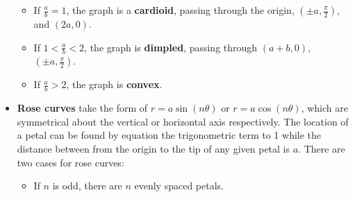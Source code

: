 \documentclass[../AP_Calculus]{subfiles}
\begin{document}
\begin{itemize}
\begin{itemize}
\begin{center}
							\end{center}
						\item If $\frac{a}{b} = 1$, the graph is a \textbf{cardioid}, passing through the origin, $\left(\pm a, \frac{\pi}{2}\right)$, and $(2a, 0)$.
							\begin{center}
							\end{center}
						\item If $1 < \frac{a}{b} < 2$, the graph is \textbf{dimpled}, passing through $(a + b, 0)$, $\left(\pm a, \frac{\pi}{2}\right)$.
							\begin{center}
							\end{center}
						\item If $\frac{a}{b} > 2$, the graph is \textbf{convex}.
							\begin{center}
							\end{center}
					\end{itemize}
				\item \textbf{Rose curves} take the form of $r = a\sin(n\theta)$ or $r = a\cos(n\theta)$, which are symmetrical about the vertical or horizontal axis respectively. The location of a petal can be found by equation the trigonometric term to 1 while the distance between from the origin to the tip of any given petal is $a$. There are two cases for rose curves:
					\begin{itemize}
						\item If $n$ is odd, there are $n$ evenly spaced petals.
							\begin{center}
							\end{center}

\end{itemize}
\end{itemize}
\end{document}
